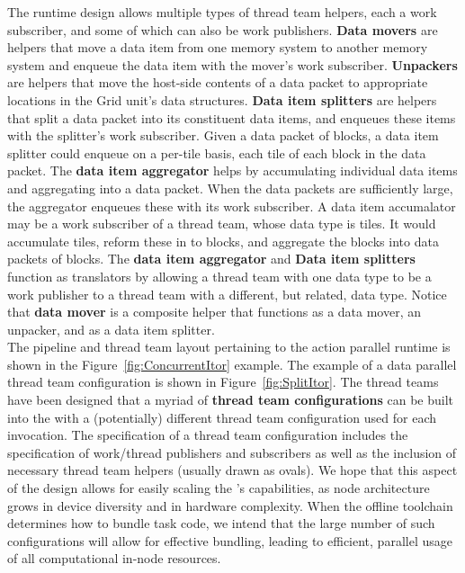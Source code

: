\documentclass{article}
\begin{document}
The runtime design allows multiple types of thread team helpers, each a work
 subscriber, and some of which can also be work
publishers. \textbf{Data movers} are helpers that move a data item from one memory system to
another memory system and enqueue the data item with the mover's work subscriber.
 \textbf{Unpackers} are helpers that move the host-side
contents of a data packet to appropriate locations in the Grid unit's data
structures.  \textbf{Data item splitters} are helpers that split a data packet
into its constituent data items, and enqueues these items with the splitter's work
subscriber.  Given a data packet of blocks, a data item splitter could enqueue
on a per-tile basis, each tile of each block in
the data packet.  The \textbf{data item aggregator} helps by
accumulating individual data items and aggregating into a data packet.  When
the data packets are sufficiently large, the aggregator enqueues these with its
work subscriber.  A data item accumalator may be a work
subscriber of a thread team, whose data type is tiles.  It would accumulate
tiles, reform these in to blocks, and aggregate the blocks into data packets of
blocks.  The \textbf{data item aggregator} and \textbf{Data item splitters} function as
translators by allowing a thread team with one data type to be a work
publisher to a thread team with a different, but related, data type.  Notice that
\textbf{data mover} is a composite helper that
functions as a data mover, an unpacker, and as a data item splitter.\\

The pipeline and thread team layout pertaining to the action parallel
runtime is shown in the Figure~\ref{fig:ConcurrentItor} example.  The example of a
data parallel \OR thread team configuration is shown in
Figure~\ref{fig:SplitItor}.  The thread teams have been designed that a myriad
of \textbf{thread team configurations} can be built into the
\OR with a (potentially) different thread team configuration used for each
\OR invocation.  The specification of a thread team configuration includes the
specification of work/thread publishers and subscribers as well as the inclusion
of necessary thread team helpers (usually drawn as ovals).  We hope that this
aspect of the design allows for easily scaling the \OR's capabilities, as
node architecture grows in device diversity and in hardware complexity.  When the
offline toolchain determines how to bundle task code, we intend that the
large number of such configurations will allow for effective bundling, leading
to efficient, parallel usage of all computational in-node resources.\\
\end{document}
